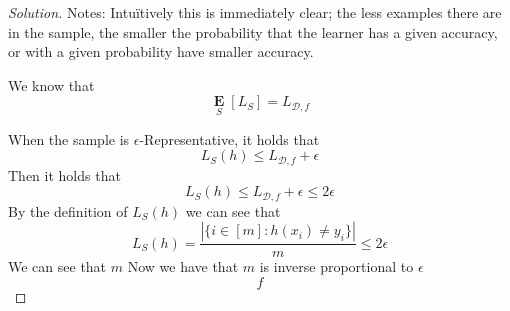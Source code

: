 \documentclass[10pt, a4paper, twoside]{amsart}
\newcommand{\R}{\ensuremath{\mathbb{R}}}
\DeclarePairedDelimiter\cbrac\{\}
\DeclarePairedDelimiter\paren()
\newcommand{\Ev}{\operatorname*{\ensuremath{\mathbf{E}}}}
\newenvironment{solution}
               {\let\oldqedsymbol=\qedsymbol
                \renewcommand{\qedsymbol}{$\blacktriangleleft$}
                \begin{proof}[Solution]}
               {\end{proof}
                \renewcommand{\qedsymbol}{\oldqedsymbol}}
\begin{document}
\begin{solution}

  Notes:
Intu\"itively this is immediately clear; the less examples there are in the sample, the smaller the probability that the learner has a given accuracy, or with a given probability have smaller accuracy.
  
  We know that 
  \begin{equation*}
    \Ev_{S}[L_S] = L_{\mathcal{D},f}
  \end{equation*}
  
  When the sample is $\epsilon$-Representative, it holds that
  \begin{equation*}
    L_S(h) \leq L_{\mathcal{D},f} +\epsilon
  \end{equation*}
  Then it holds that
  \begin{equation*}
    L_S(h) \leq L_{\mathcal{D},f} +\epsilon \leq 2\epsilon
  \end{equation*}
  By the definition of $L_S(h)$ we can see that
  \begin{equation*}
    L_S(h) = \frac{|\{i \in[m]:h(x_i)\neq y_i \}|}{m} \leq 2\epsilon
  \end{equation*}
  We can see that $m$ 
  Now we have that $m$ is inverse proportional to $\epsilon$
  \begin{equation*}
f    
  \end{equation*}
  
  



\end{solution}
\end{document}
